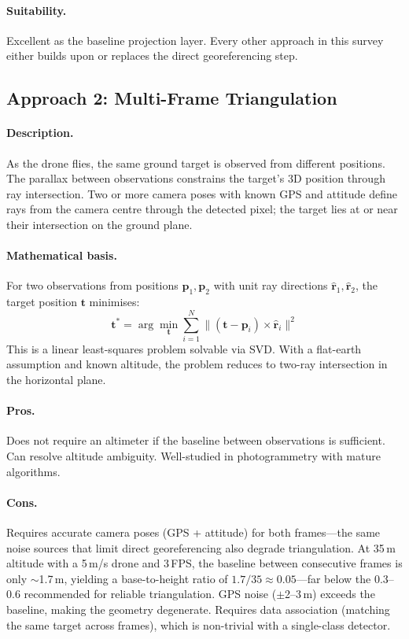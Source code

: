 \paragraph{Suitability.}  Excellent as the baseline projection layer.  Every other approach in this survey either builds upon or replaces the direct georeferencing step.

\subsection{Approach 2: Multi-Frame Triangulation}\label{sec:approach-triangulation}

\paragraph{Description.}
As the drone flies, the same ground target is observed from different positions.  The parallax between observations constrains the target's 3D position through ray intersection.  Two or more camera poses with known GPS and attitude define rays from the camera centre through the detected pixel; the target lies at or near their intersection on the ground plane.

\paragraph{Mathematical basis.}
For two observations from positions $\mathbf{p}_1, \mathbf{p}_2$ with unit ray directions $\hat{\mathbf{r}}_1, \hat{\mathbf{r}}_2$, the target position $\mathbf{t}$ minimises:
\begin{equation}
  \mathbf{t}^* = \arg\min_{\mathbf{t}} \sum_{i=1}^{N} \| (\mathbf{t} - \mathbf{p}_i) \times \hat{\mathbf{r}}_i \|^2
\end{equation}
This is a linear least-squares problem solvable via SVD.  With a flat-earth assumption and known altitude, the problem reduces to two-ray intersection in the horizontal plane.

\paragraph{Pros.}
Does not require an altimeter if the baseline between observations is sufficient.  Can resolve altitude ambiguity.  Well-studied in photogrammetry with mature algorithms.

\paragraph{Cons.}
Requires accurate camera poses (GPS + attitude) for both frames---the same noise sources that limit direct georeferencing also degrade triangulation.  At 35\,m altitude with a 5\,m/s drone and 3\,FPS, the baseline between consecutive frames is only $\sim$1.7\,m, yielding a base-to-height ratio of $1.7/35 \approx 0.05$---far below the 0.3--0.6 recommended for reliable triangulation.  GPS noise ($\pm$2--3\,m) exceeds the baseline, making the geometry degenerate.  Requires data association (matching the same target across frames), which is non-trivial with a single-class detector.

